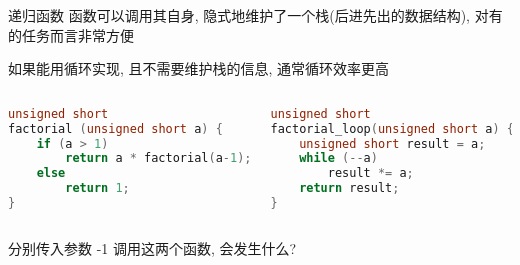 \begin{frame}[fragile]{递归函数}
    函数可以调用其自身, 隐式地维护了一个栈(后进先出的数据结构), 对有的任务而言非常方便

    如果能用循环实现, 且不需要维护栈的信息, 通常循环效率更高
    \begin{columns}[T,onlytextwidth]
        \scriptsize
        \begin{lstlisting}[language=c]
unsigned short
factorial (unsigned short a) {
    if (a > 1)
        return a * factorial(a-1);
    else
        return 1;
}
        \end{lstlisting}

        \scriptsize
        \begin{lstlisting}[language=c]
unsigned short
factorial_loop(unsigned short a) {
    unsigned short result = a;
    while (--a)
        result *= a;
    return result;
}
        \end{lstlisting}
    \end{columns}

    分别传入参数 -1 调用这两个函数, 会发生什么?
\end{frame}